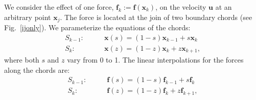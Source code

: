 \documentclass[12pt]{article}
\newcommand{\bx}{\mathbf{x}}
\newcommand{\bu}{\mathbf{u}}
\newcommand{\ff}{\mathbf{f}}
\newcommand{\baas}[1]{\begin{align*} #1 \end{align*}}
\begin{document}
		 \begin{figure}
			\vspace{-3mm} 
				\vspace{-5mm}
		\end{figure}
	We consider the effect of one force, $\ff_k := \ff(\bx_k)$, on the velocity $\bu$ at an arbitrary point $\bx_j$. The force is located at the join of two boundary chords  (see Fig.~\ref{ijonly}). We parameterize the equations of the chords:
	\baas{
	S_{k-1}: & \qquad \bx(s) = (1-s)\bx_{k-1} 	+ s\bx_k \\
	S_k: &  \qquad \bx(z) = (1-z)\bx_k 		+ z\bx_{k+1}, 
	} 
	where both $s$ and $z$ vary from 0 to 1.
	The linear interpolations for the forces along the chords are:
	\baas{
	S_{k-1}: & \qquad \ff(s) = (1-s)\ff_{k-1} 	+ s\ff_k \\
	S_k: &  \qquad \ff(z) = (1-z)\ff_k 		+ z\ff_{k+1},
	} 
\end{document}
